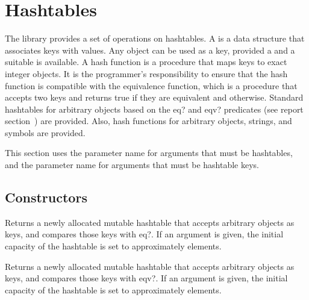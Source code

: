 \chapter{Hashtables}
\label{hashtablechapter}

The  library provides a set of operations on
hashtables.
A  is a data structure that associates keys with values.
Any object can be used as a key, provided a 
and a suitable  is available.  A hash function is a
procedure that maps
keys to exact integer objects.
It is the programmer's responsibility to ensure that the hash function
is compatible with the equivalence function,
which is a procedure that accepts two keys and returns true if they
are equivalent and \schfalse{} otherwise.
Standard hashtables for arbitrary objects based on the {\cf eq?} and 
{\cf eqv?} predicates (see report section~) are provided.  
Also, hash functions for arbitrary objects, strings, and symbols are provided.

This section uses the  parameter name for arguments
that must be hashtables, and the  parameter name for
arguments that must be hashtable keys.

\section{Constructors}


\begin{entry}{%
}

Returns a newly allocated mutable hashtable that accepts
arbitrary objects as keys,
and compares those keys with {\cf eq?}. If an argument is given, the initial 
capacity of the hashtable is set to approximately  elements.

\end{entry}

\begin{entry}{%
}

Returns a newly allocated mutable hashtable that accepts
arbitrary objects as keys,
and compares those keys with {\cf eqv?}.
If an argument is given, the initial 
capacity of the hashtable is set to approximately  elements.

\end{entry}

